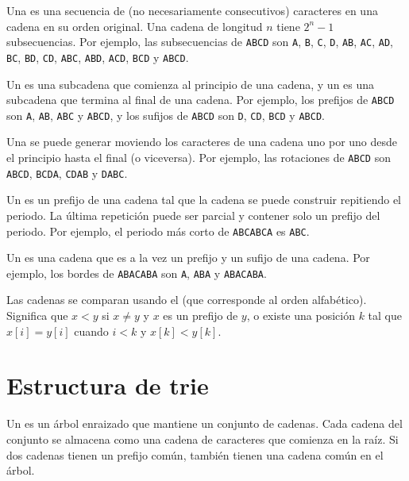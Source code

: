 
Una  es una secuencia de
(no necesariamente consecutivos) caracteres
en una cadena en su orden original.
Una cadena de longitud $n$ tiene $2^n-1$ subsecuencias.
Por ejemplo, las subsecuencias de
\texttt{ABCD} son
\texttt{A}, \texttt{B}, \texttt{C}, \texttt{D},
\texttt{AB}, \texttt{AC}, \texttt{AD},
\texttt{BC}, \texttt{BD}, \texttt{CD},
\texttt{ABC}, \texttt{ABD}, \texttt{ACD},
\texttt{BCD} y \texttt{ABCD}.


Un  es una subcadena que comienza al principio
de una cadena,
y un  es una subcadena que termina al final
de una cadena.
Por ejemplo,
los prefijos de \texttt{ABCD} son
\texttt{A}, \texttt{AB}, \texttt{ABC} y \texttt{ABCD},
y los sufijos de \texttt{ABCD} son
\texttt{D}, \texttt{CD}, \texttt{BCD} y \texttt{ABCD}.


Una  se puede generar moviendo
los caracteres de una cadena uno por uno desde el principio
hasta el final (o viceversa).
Por ejemplo, las rotaciones de \texttt{ABCD} son
\texttt{ABCD}, \texttt{BCDA}, \texttt{CDAB} y \texttt{DABC}.


Un  es un prefijo de una cadena tal que
la cadena se puede construir repitiendo el periodo.
La última repetición puede ser parcial y contener
solo un prefijo del periodo.
Por ejemplo, el periodo más corto de
\texttt{ABCABCA} es \texttt{ABC}.


Un  es una cadena que es a la vez
un prefijo y un sufijo de una cadena.
Por ejemplo, los bordes de \texttt{ABACABA}
son \texttt{A}, \texttt{ABA} y \texttt{ABACABA}.


Las cadenas se comparan usando el 
(que corresponde al orden alfabético).
Significa que $x<y$ si $x \neq y$ y $x$ es un prefijo de $y$,
o existe una posición $k$ tal que
$x[i]=y[i]$ cuando $i<k$ y $x[k]<y[k]$.

\section{Estructura de trie}


Un  es un árbol enraizado que
mantiene un conjunto de cadenas.
Cada cadena del conjunto se almacena como
una cadena de caracteres que comienza en la raíz.
Si dos cadenas tienen un prefijo común,
también tienen una cadena común en el árbol.


